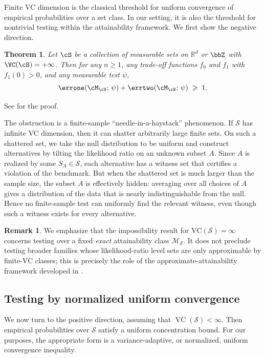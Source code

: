 \documentclass[english]{article}
\theoremstyle{plain}
\newtheorem{theorem}{Theorem}[section]
\theoremstyle{definition}
\newtheorem{remark}{Remark}[section]
\newcommand{\fnull}{f_0}
\newcommand{\falt}{f_1}
\begin{document}
Finite VC dimension is the classical threshold for uniform convergence of
empirical probabilities over a set class. In our setting, it is also the
threshold for nontrivial testing within the attainability framework. We first
show the negative direction.

\begin{theorem}\label{thm:vc-necessary}
Let $\cS$ be a collection of measurable sets on $\mathbb{R}^d$ or $\bbZ$ with
$\VC(\cS) = +\infty$. Then for any $n \geqslant 1$, any trade-off functions
$\fnull$ and $\falt$ with $\falt(0) > 0$, and
any measurable test $\psi$,
\[
\errone(\cM_\cS;\, \psi) + \errtwo(\cM_\cS;\, \psi) \;\geqslant\; 1.
\]
\end{theorem}

\noindent See  for the proof. 
\medskip




The obstruction is a finite-sample ``needle-in-a-haystack'' phenomenon. If
\(\mathcal S\) has infinite VC dimension, then it can shatter arbitrarily large
finite sets. On such a shattered set, we take the null distribution to be
uniform and construct alternatives by tilting the likelihood ratio on an
unknown subset \(A\). Since \(A\) is realized by some \(S_A\in\mathcal S\),
each alternative has a witness set that certifies a violation of the benchmark.
But when the shattered set is much larger than the sample size, the subset
\(A\) is effectively hidden: averaging over all choices of \(A\) gives a
distribution of the data that is nearly indistinguishable from the null. Hence
no finite-sample test can uniformly find the relevant witness, even though such
a witness exists for every alternative.
\begin{remark}
We emphasize that the impossibility result for $\mathrm{VC}(\mathcal S)=\infty$ concerns testing over a
fixed \emph{exact} attainability class $\mathcal M_{\mathcal S}$. It does not preclude testing broader
families whose likelihood-ratio level sets are only approximable by finite-VC classes; this is precisely
the role of the approximate-attainability framework developed in .
\end{remark}


\subsection{Testing by normalized uniform convergence}\label{sec:test_by_normalized_vc}

We now turn to the positive direction, assuming that 
$\operatorname{VC}(\mathcal S)<\infty$. Then empirical probabilities over
$\mathcal S$ satisfy a uniform concentration bound. For our purposes, the
appropriate form is a variance-adaptive, or normalized, uniform convergence
inequality.
\end{document}
